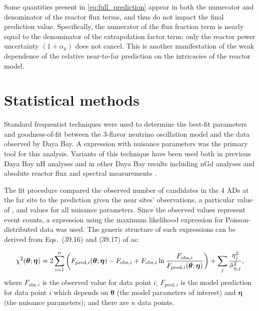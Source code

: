 Some quantities present in \cref{eq:full_prediction}
appear in both the numerator and denominator of the reactor flux terms,
and thus do not impact the final prediction value.
Specifically, the numerator of the flux fraction term
is nearly equal to the denominator of the extrapolation factor term;
only the reactor power uncertainty $(1 + \alpha_k)$ does not cancel.
This is another manifestation of the weak dependence of the
relative near-to-far prediction
on the intricacies of the reactor \nuebar{} model.

\section{Statistical methods}
\label{sec:fitter}

Standard frequentist techniques were used to determine the best-fit parameters
and goodness-of-fit between the 3-flavor neutrino oscillation model
and the data observed by Daya Bay.
A \chisquare{} expression with nuisance parameters
was the primary tool for this analysis.
Variants of this technique have been used both in previous Daya Bay nH analyses
and in other Daya Bay results including nGd \thetaot{} analyses
and absolute reactor \nuebar{} flux and spectral measurements
\cite{ngd2016,nh2016,reactorflux2017,extractionreactorflux2019}.

The fit procedure compared the observed number of \nuebar{} candidates
in the 4 ADs at the far site to the prediction
given the near sites' observations, a particular value of \thetaot{},
and values for all nuisance parameters.
Since the observed values represent event counts,
a \chisquare{} expression using the maximum likelihood expression
for Poisson-distributed data was used.
The generic structure of such \chisquare{} expressions
can be derived from Eqs.~(39.16) and (39.17) of \cite{pdg} as:

\begin{equation}
    \label{eq:chisquare_generic}
    \chi^2(\boldsymbol{\theta};\boldsymbol{\eta}) = 2\sum_{i=1}^{n} \left(
        F_{\text{pred},i}(\boldsymbol{\theta};\boldsymbol{\eta}) - F_{\text{obs},i}
        + F_{\text{obs},i}\ln
        \frac{F_{\text{obs},i}}{F_{\text{pred},i}(\boldsymbol{\theta};\boldsymbol{\eta})}
        \right)
        +
        \sum_j \frac{\eta_j^2}{\tilde{\sigma}_{\eta,j}^2},
\end{equation}
where $F_{\text{obs},i}$ is the observed value for data point $i$;
$F_{\text{pred},i}$
is the model prediction for data point $i$
which depends on $\boldsymbol{\theta}$ (the model parameters of interest)
and $\boldsymbol{\eta}$
(the nuisance parameters);
and there are $n$ data points.

